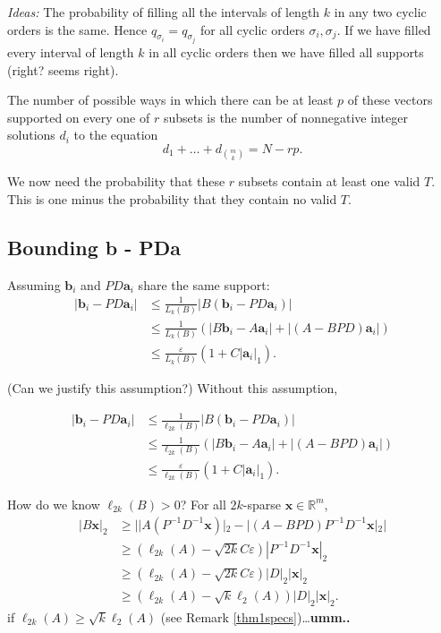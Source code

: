 \documentclass[journal, onecolumn]{IEEEtran}
\begin{document}
\emph{Ideas:} The probability of filling all the intervals of length $k$ in any two cyclic orders is the same. Hence $q_{\sigma_i} = q_{\sigma_j}$ for all cyclic orders $\sigma_i, \sigma_j$. If we have filled every interval of length $k$ in all cyclic orders then we have filled all supports (right? seems right).

The number of possible ways in which there can be at least $p$ of these vectors supported on every one of $r$ subsets is the number of nonnegative integer solutions $d_i$ to the equation
\[ d_1 + \ldots + d_{{m \choose k} }= N - rp.\]

We now need the probability that these $r$ subsets contain at least one valid $T$.  This is one minus the probability that they contain no valid $T$. 

\subsection{Bounding b - PDa}

Assuming $\mathbf{b}_i$ and $PD\mathbf{a}_i$ share the same support:
\begin{align*}
|\mathbf{b}_i - PD\mathbf{a}_i| 
&\leq \frac{1}{L_k(B)}|B(\mathbf{b}_i - PD\mathbf{a}_i)| \\
&\leq \frac{1}{L_k(B)} (|B\mathbf{b}_i - A\mathbf{a}_i| + |(A - BPD)\mathbf{a}_i|) \\
&\leq \frac{\varepsilon}{L_k(B)}(1+C|\mathbf{a}_i|_1).
\end{align*}

(Can we justify this assumption?) Without this assumption,

\begin{align*}
|\mathbf{b}_i - PD\mathbf{a}_i| 
&\leq \frac{1}{\ell_{2k}(B)}|B(\mathbf{b}_i - PD\mathbf{a}_i)| \\
&\leq \frac{1}{\ell_{2k}(B)} (|B\mathbf{b}_i - A\mathbf{a}_i| + |(A - BPD)\mathbf{a}_i|) \\
&\leq \frac{\varepsilon}{\ell_{2k}(B)}(1+C|\mathbf{a}_i|_1).
\end{align*}

How do we know $\ell_{2k}(B) > 0$? For all $2k$-sparse $\mathbf{x} \in \mathbb{R}^m$,
\begin{align*}
|B\mathbf{x}|_2 
&\geq | |A(P^{-1}D^{-1}\mathbf{x})|_2 - |(A-BPD)P^{-1}D^{-1}\mathbf{x}|_2 | \\
&\geq (\ell_{2k}(A) - \sqrt{2k}C\varepsilon)|P^{-1}D^{-1}\mathbf{x}|_2 \\
&\geq (\ell_{2k}(A) - \sqrt{2k}C\varepsilon)|D|_2|\mathbf{x}|_2 \\
&\geq (\ell_{2k}(A) - \sqrt{k}\ell_2(A))|D|_2|\mathbf{x}|_2. 
\end{align*}
%
if $\ell_{2k}(A) \geq \sqrt{k}\ell_2(A)$ (see Remark \ref{thm1specs})\ldots\textbf{umm..} 
\end{document}
